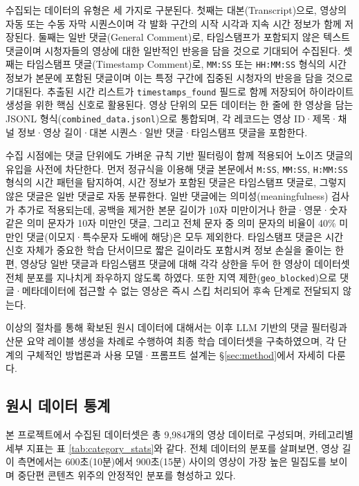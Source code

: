 \documentclass[11pt,a4paper]{article}
\begin{document}
수집되는 데이터의 유형은 세 가지로 구분된다. 첫째는 대본(Transcript)으로, 영상의 자동 또는 수동 자막 시퀀스이며 각 발화 구간의 시작 시각과 지속 시간 정보가 함께 저장된다. 둘째는 일반 댓글(General Comment)로, 타임스탬프가 포함되지 않은 텍스트 댓글이며 시청자들의 영상에 대한 일반적인 반응을 담을 것으로 기대되어 수집된다. 셋째는 타임스탬프 댓글(Timestamp Comment)로, \texttt{MM:SS} 또는 \texttt{HH:MM:SS} 형식의 시간 정보가 본문에 포함된 댓글이며 이는 특정 구간에 집중된 시청자의 반응을 담을 것으로 기대된다. 추출된 시간 리스트가 \texttt{timestamps\_found} 필드로 함께 저장되어 하이라이트 생성을 위한 핵심 신호로 활용된다. 영상 단위의 모든 데이터는 한 줄에 한 영상을 담는 JSONL 형식(\texttt{combined\_data.jsonl})으로 통합되며, 각 레코드는 영상 ID·제목·채널 정보·영상 길이·대본 시퀀스·일반 댓글·타임스탬프 댓글을 포함한다.

수집 시점에는 댓글 단위에도 가벼운 규칙 기반 필터링이 함께 적용되어 노이즈 댓글의 유입을 사전에 차단한다. 먼저 정규식을 이용해 댓글 본문에서 \texttt{M:SS}, \texttt{MM:SS}, \texttt{H:MM:SS} 형식의 시간 패턴을 탐지하여, 시간 정보가 포함된 댓글은 타임스탬프 댓글로, 그렇지 않은 댓글은 일반 댓글로 자동 분류한다. 일반 댓글에는 의미성(meaningfulness) 검사가 추가로 적용되는데, 공백을 제거한 본문 길이가 10자 미만이거나 한글·영문·숫자 같은 의미 문자가 10자 미만인 댓글, 그리고 전체 문자 중 의미 문자의 비율이 40\% 미만인 댓글(이모지·특수문자 도배에 해당)은 모두 제외한다. 타임스탬프 댓글은 시간 신호 자체가 중요한 학습 단서이므로 짧은 길이라도 포함시켜 정보 손실을 줄이는 한편, 영상당 일반 댓글과 타임스탬프 댓글에 대해 각각 상한을 두어 한 영상이 데이터셋 전체 분포를 지나치게 좌우하지 않도록 하였다. 또한 지역 제한(\texttt{geo\_blocked})으로 댓글·메타데이터에 접근할 수 없는 영상은 즉시 스킵 처리되어 후속 단계로 전달되지 않는다.

이상의 절차를 통해 확보된 원시 데이터에 대해서는 이후 LLM 기반의 댓글 필터링과 산문 요약 레이블 생성을 차례로 수행하여 최종 학습 데이터셋을 구축하였으며, 각 단계의 구체적인 방법론과 사용 모델·프롬프트 설계는 \S\ref{sec:method}에서 자세히 다룬다.

\subsection{원시 데이터 통계}


본 프로젝트에서 수집된 데이터셋은 총 9,984개의 영상 데이터로 구성되며, 카테고리별 세부 지표는 표 \ref{tab:category_stats}와 같다. 전체 데이터의 분포를 살펴보면, 영상 길이 측면에서는 600초(10분)에서 900초(15분) 사이의 영상이 가장 높은 밀집도를 보이며 중단편 콘텐츠 위주의 안정적인 분포를 형성하고 있다.
\end{document}
